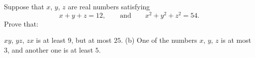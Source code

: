 Suppose that $x$, $y$, $z$ are real numbers  satisfying \[x+y+z=12,\qquad\text{and}\qquad x^2+y^2+z^2=54.\] Prove that:
\begin{itemize}
\end{itemize}
$xy$, $yz$, $zx$ is at least $9$, but at most $25$.
(b) One of the numbers $x$, $y$, $z$ is at most $3$, and another one is at least $5$.